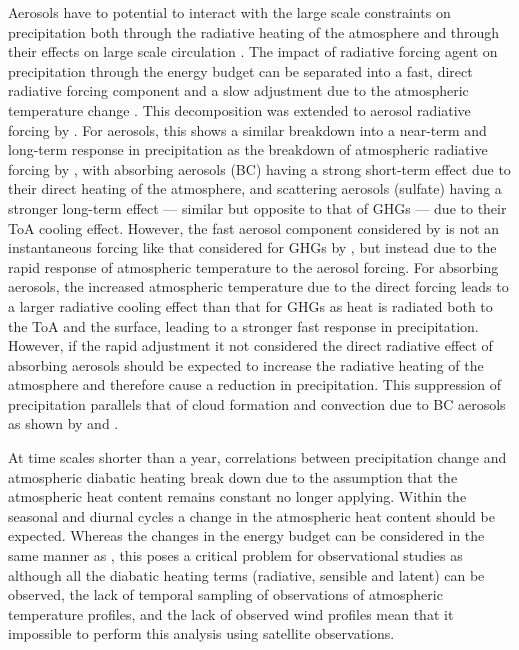 Aerosols have to potential to interact with the large scale constraints on precipitation both through the radiative heating of the atmosphere \citep{suzuki_perturbations_2019} and through their effects on large scale circulation \citep{bollasina_anthropogenic_2011, nober_sensitivity_2003}. 
The impact of radiative forcing agent on precipitation through the energy budget can be separated into a fast, direct radiative forcing component and a slow adjustment due to the atmospheric temperature change \citep{allen_constraints_2002}. This decomposition was extended to aerosol radiative forcing by \citet{richardson_drivers_2018}. For aerosols, this shows a similar breakdown into a near-term and long-term response in precipitation as the breakdown of atmospheric radiative forcing by \citet{suzuki_perturbations_2019}, with absorbing aerosols (BC) having a strong short-term effect due to their direct heating of the atmosphere, and scattering aerosols (sulfate) having a stronger long-term effect --- similar but opposite to that of GHGs --- due to their ToA cooling effect.
However, the fast aerosol component considered by \citet{richardson_drivers_2018} is not an instantaneous forcing like that considered for GHGs by \citet{allen_constraints_2002}, but instead due to the rapid response of atmospheric temperature to the aerosol forcing.
For absorbing aerosols, the increased atmospheric temperature due to the direct forcing leads to a larger radiative cooling effect than that for GHGs as heat is radiated both to the ToA and the surface, leading to a stronger fast response in precipitation. 
However, if the rapid adjustment it not considered the direct radiative effect of absorbing aerosols should be expected to increase the radiative heating of the atmosphere and therefore cause a reduction in precipitation.
This suppression of precipitation parallels that of cloud formation and convection due to BC aerosols as shown by \citet{koren_smoke_2008} and \citet{fan_effects_2008}.

At time scales shorter than a year, correlations between precipitation change and atmospheric diabatic heating break down \citep{nogueira_multi-scale_2019} due to the assumption that the atmospheric heat content remains constant no longer applying.
Within the seasonal and diurnal cycles a change in the atmospheric heat content should be expected.
Whereas the changes in the energy budget can be considered in the same manner as \citet{muller_energetic_2011}, this poses a critical problem for observational studies as although all the diabatic heating terms (radiative, sensible and latent) can be observed, the lack of temporal sampling of observations of atmospheric temperature profiles, and the lack of observed wind profiles mean that it impossible to perform this analysis using satellite observations.


